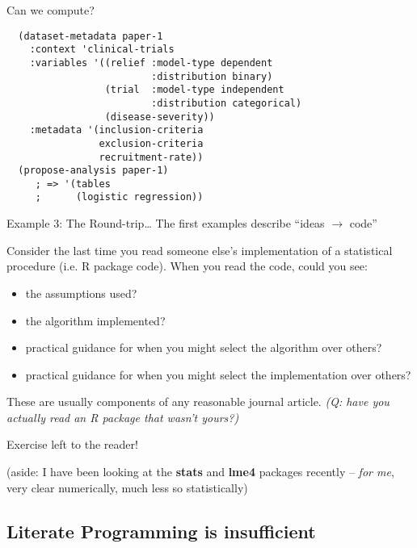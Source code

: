\documentclass{beamer}
\begin{document}
\begin{frame}[fragile]{Can we compute?}
\begin{verbatim}
  (dataset-metadata paper-1
    :context 'clinical-trials
    :variables '((relief :model-type dependent
                         :distribution binary)
                 (trial  :model-type independent
                         :distribution categorical)
                 (disease-severity))
    :metadata '(inclusion-criteria
                exclusion-criteria
                recruitment-rate))
  (propose-analysis paper-1)
     ; => '(tables
     ;      (logistic regression))
\end{verbatim}
\end{frame}

\begin{frame}{Example 3: The Round-trip\ldots} 
  \label{example3}
  The first examples describe ``ideas $\rightarrow$ code''

  Consider the last time you read someone else's implementation of a
  statistical procedure (i.e. R package code).  When you read the
  code, could you see:
  \begin{itemize}
  \item the assumptions used?
  \item the algorithm implemented?
  \item practical guidance for when you might select the algorithm
    over others? 
  \item practical guidance for when you might select the
    implementation over others? 
  \end{itemize}
  These are usually components of any reasonable journal article.
  \textit{(Q: have you actually read an R package that wasn't yours?)}
\end{frame}

\begin{frame}{Exercise left to the reader!}

  (aside: I have been looking at the \textbf{stats} and \textbf{lme4}
  packages recently -- \textit{for me}, very clear numerically, much
  less so statistically)
\end{frame}



\subsection{Literate Programming is insufficient}
\end{document}
